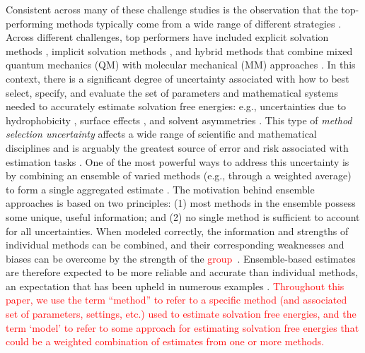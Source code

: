 \documentclass[journal=jpcbfk, manuscript=article]{achemso}
\newcommand{\+}[1]{\ensuremath{\mathbf{#1}}}
\newcommand{\rev}[1]{\textsf{\textcolor{red}{#1}}}
\begin{document}
Consistent across many of these challenge studies is the observation that the top-performing methods typically come from a wide range of different strategies \cite{Nicholls:2008, Mobley:2009b, Mobley:2009, Mobley:2014}.
Across different challenges, top performers have included explicit solvation methods \cite{Klimovich:2010, Levy:1998, Mobley:2009c}, implicit solvation methods \cite{Mennucci:2007,Jorgensen:2004}, and hybrid methods that combine mixed quantum mechanics (QM) with molecular mechanical (MM) approaches \cite{Konig:2014, Kamerlin:2009}.
In this context, there is a significant degree of uncertainty associated with how to best select, specify, and evaluate the set of parameters and mathematical systems needed to accurately estimate solvation free energies: e.g., uncertainties due to hydrophobicity \cite{Ashbaugh:1999}, surface effects \cite{Chorny:05}, and solvent asymmetries \cite{Mobley:08}.  This type of \emph{method selection uncertainty} affects a wide range of scientific and mathematical disciplines and is arguably the greatest source of error and risk associated with estimation tasks \cite{Rojas:2010, Apostolakis:1990, Devooght:1998, Neuman:2003}.
One of the most powerful ways to address this uncertainty is by combining an ensemble of varied methods (e.g., through a weighted average) to form a single aggregated estimate \cite{Bates:1969, Opitz:1999, Rokach:2010, Hoeting:1999}.
The motivation behind ensemble approaches is based on two principles: (1) most methods in the ensemble possess some unique, useful information; and (2) no single method is sufficient to account for all uncertainties.
When modeled correctly, the information and strengths of individual methods can be combined, and their corresponding weaknesses and biases can be overcome by the strength of the \rev{group}~\cite{Seni:2010, Hoeting:1999,Raftery:1998,Raftery:1995}. 
Ensemble-based estimates are therefore expected to be more reliable and accurate than individual methods, an expectation that has been upheld in numerous examples \cite{Gosink:2014, Zhang:2003, Bates:1969, Morales-Casique:2010, Opitz:1999, Rokach:2010, Hoeting:1999, Seni:2010, Raftery:2005, Vlachopoulo:2013, Seni:2010, Hoeting:1999, Raftery:1998, Raftery:1995}.
\rev{Throughout this paper, we use the term ``method'' to refer to a specific method (and associated set of parameters, settings, etc.) used to estimate solvation free energies, and the term `model' to refer to some approach for estimating solvation free energies that could be a weighted combination of estimates from one or more methods.}
\end{document}

